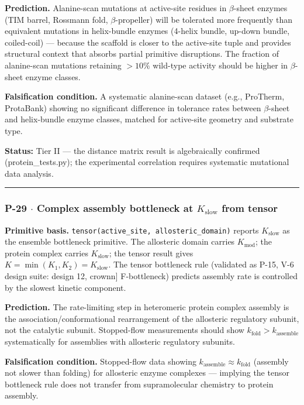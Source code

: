 \documentclass[12pt,a4paper]{article}
\begin{document}
\textbf{Prediction.} Alanine-scan mutations at active-site residues in $\beta$-sheet enzymes (TIM barrel, Rossmann fold, $\beta$-propeller) will be tolerated more frequently than equivalent mutations in helix-bundle enzymes (4-helix bundle, up-down bundle, coiled-coil) --- because the scaffold is closer to the active-site tuple and provides structural context that absorbs partial primitive disruptions. The fraction of alanine-scan mutations retaining $> 10\%$ wild-type activity should be higher in $\beta$-sheet enzyme classes.

\textbf{Falsification condition.} A systematic alanine-scan dataset (e.g., ProTherm, ProtaBank) showing no significant difference in tolerance rates between $\beta$-sheet and helix-bundle enzyme classes, matched for active-site geometry and substrate type.

\textbf{Status:} Tier II --- the distance matrix result is algebraically confirmed (protein\_tests.py); the experimental correlation requires systematic mutational data analysis.

\begin{center}
\rule{0.5\textwidth}{0.4pt}
\end{center}

\subsubsection{P-29 $\cdot$ Complex assembly bottleneck at $K_\text{slow}$ from tensor}

\textbf{Primitive basis.} \texttt{tensor(active\_site, allosteric\_domain)} reports $K_\text{slow}$ as the ensemble bottleneck primitive. The allosteric domain carries $K_\text{mod}$; the protein complex carries $K_\text{slow}$; the tensor result gives $K = \min(K_1, K_2) = K_\text{slow}$. The tensor bottleneck rule (validated as P-15, V-6 design suite: design 12, crown\otimesCB{[}n{]} F-bottleneck) predicts assembly rate is controlled by the slowest kinetic component.

\textbf{Prediction.} The rate-limiting step in heteromeric protein complex assembly is the association/conformational rearrangement of the allosteric regulatory subunit, not the catalytic subunit. Stopped-flow measurements should show $k_\text{fold} > k_\text{assemble}$ systematically for assemblies with allosteric regulatory subunits.

\textbf{Falsification condition.} Stopped-flow data showing $k_\text{assemble} \approx k_\text{fold}$ (assembly not slower than folding) for allosteric enzyme complexes --- implying the tensor bottleneck rule does not transfer from supramolecular chemistry to protein assembly.
\end{document}
